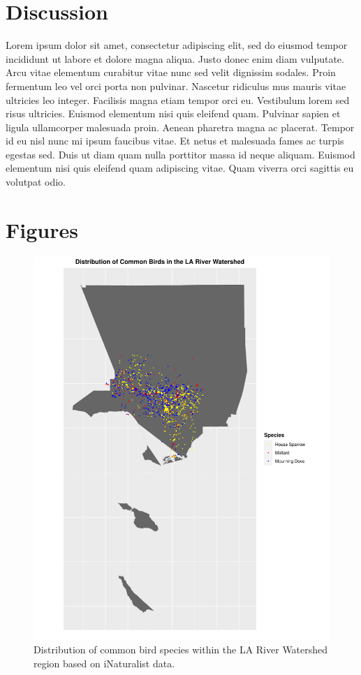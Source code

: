 \documentclass[letterpaper]{article}
\begin{document}
\section{Discussion}

Lorem ipsum dolor sit amet, consectetur adipiscing elit, sed do eiusmod tempor incididunt ut labore et dolore magna aliqua. Justo donec enim diam vulputate. Arcu vitae elementum curabitur vitae nunc sed velit dignissim sodales. Proin fermentum leo vel orci porta non pulvinar. Nascetur ridiculus mus mauris vitae ultricies leo integer. Facilisis magna etiam tempor orci eu. Vestibulum lorem sed risus ultricies. Euismod elementum nisi quis eleifend quam. Pulvinar sapien et ligula ullamcorper malesuada proin. Aenean pharetra magna ac placerat. Tempor id eu nisl nunc mi ipsum faucibus vitae. Et netus et malesuada fames ac turpis egestas sed. Duis ut diam quam nulla porttitor massa id neque aliquam. Euismod elementum nisi quis eleifend quam adipiscing vitae. Quam viverra orci sagittis eu volutpat odio.

\newpage

\section{Figures}

\begin{figure}[h]
	\centering
	\includegraphics[width=0.45\paperwidth]{dist_map1}
	\caption{Distribution of common bird species within the LA River Watershed region based on iNaturalist data.\label{fig:map}}
\end{figure}
\end{document}
